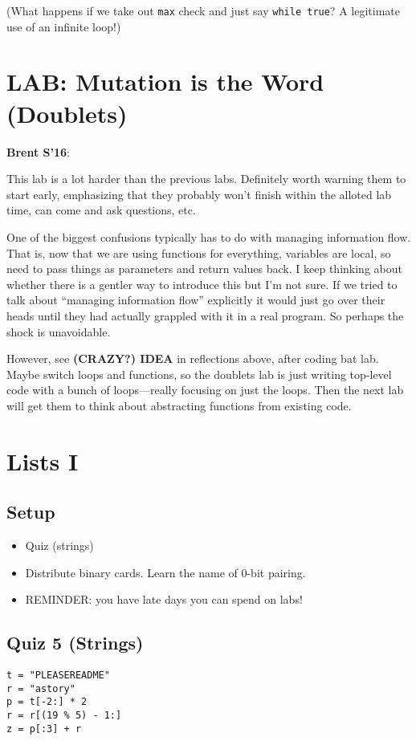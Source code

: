 \documentclass{article}
\newenvironment{reflect}[1]
{
  \noindent
  \begin{lrbox}{\reflectbox}
    \begin{minipage}[t]{\textwidth}
      \textbf{#1}:
}{
    \end{minipage}
  \end{lrbox}
  \fbox{\usebox{\reflectbox}}
}
\begin{document}
(What happens if we take out \verb|max| check and just say
\verb|while true|?  A legitimate use of an infinite loop!)

\section*{LAB: Mutation is the Word (Doublets)}

\begin{reflect}{Brent S'16}
  This lab is a lot harder than the previous labs.  Definitely worth
  warning them to start early, emphasizing that they probably won't
  finish within the alloted lab time, can come and ask questions, etc.

  One of the biggest confusions typically has to do with managing
  information flow.  That is, now that we are using functions for
  everything, variables are local, so need to pass things as
  parameters and return values back.  I keep thinking about whether
  there is a gentler way to introduce this but I'm not sure.  If we
  tried to talk about ``managing information flow'' explicitly it
  would just go over their heads until they had actually grappled with
  it in a real program.  So perhaps the shock is unavoidable.

  However, see \textbf{(CRAZY?) IDEA} in reflections above, after
  coding bat lab.  Maybe switch loops and functions, so the doublets
  lab is just writing top-level code with a bunch of loops---really
  focusing on just the loops.  Then the next lab will get them to
  think about abstracting functions from existing code.
\end{reflect}

\newpage
\section{Lists I}

\subsection*{Setup}
\begin{itemize}
\item Quiz (strings)
\item Distribute binary cards.  Learn the name of 0-bit pairing.
\item REMINDER: you have late days you can spend on labs!
\end{itemize}

\subsection*{Quiz 5 (Strings)}
\begin{verbatim}
t = "PLEASEREADME"
r = "astory"
p = t[-2:] * 2
r = r[(19 % 5) - 1:]
z = p[:3] + r
\end{verbatim}
\end{document}
